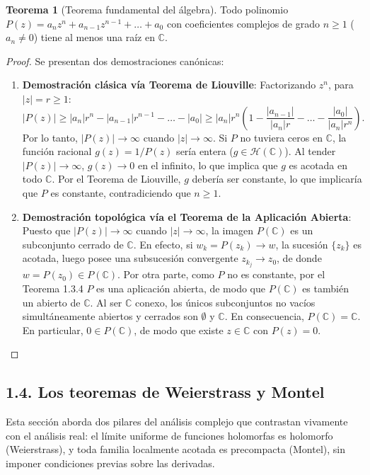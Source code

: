 \documentclass[11pt,a4paper]{article}
\theoremstyle{definition}
\newtheorem{teorema}{Teorema}[section]
\theoremstyle{remark}
\numberwithin{equation}{section}
\begin{document}
\begin{teorema}[Teorema fundamental del álgebra]
Todo polinomio $P(z) = a_n z^n + a_{n-1} z^{n-1} + \dots + a_0$ con coeficientes complejos de grado $n \ge 1$ ($a_n \neq 0$) tiene al menos una raíz en $\mathbb{C}$.
\end{teorema}
\begin{proof}
Se presentan dos demostraciones canónicas:
\begin{enumerate}
\item \textbf{Demostración clásica vía Teorema de Liouville}:
Factorizando $z^n$, para $|z| = r \ge 1$:
\[
|P(z)| \ge |a_n| r^n - |a_{n-1}| r^{n-1} - \dots - |a_0| \ge |a_n| r^n \left( 1 - \frac{|a_{n-1}|}{|a_n|r} - \dots - \frac{|a_0|}{|a_n|r^n} \right).
\]
Por lo tanto, $|P(z)| \to \infty$ cuando $|z| \to \infty$. 
Si $P$ no tuviera ceros en $\mathbb{C}$, la función racional $g(z) = 1/P(z)$ sería entera ($g \in \mathcal{H}(\mathbb{C})$). Al tender $|P(z)| \to \infty$, $g(z) \to 0$ en el infinito, lo que implica que $g$ es acotada en todo $\mathbb{C}$. Por el Teorema de Liouville, $g$ debería ser constante, lo que implicaría que $P$ es constante, contradiciendo que $n \ge 1$.
\item \textbf{Demostración topológica vía el Teorema de la Aplicación Abierta}:
Puesto que $|P(z)| \to \infty$ cuando $|z| \to \infty$, la imagen $P(\mathbb{C})$ es un subconjunto cerrado de $\mathbb{C}$. En efecto, si $w_k = P(z_k) \to w$, la sucesión $\{z_k\}$ es acotada, luego posee una subsucesión convergente $z_{k_j} \to z_0$, de donde $w = P(z_0) \in P(\mathbb{C})$. 
Por otra parte, como $P$ no es constante, por el Teorema 1.3.4 $P$ es una aplicación abierta, de modo que $P(\mathbb{C})$ es también un abierto de $\mathbb{C}$. Al ser $\mathbb{C}$ conexo, los únicos subconjuntos no vacíos simultáneamente abiertos y cerrados son $\emptyset$ y $\mathbb{C}$. En consecuencia, $P(\mathbb{C}) = \mathbb{C}$. En particular, $0 \in P(\mathbb{C})$, de modo que existe $z \in \mathbb{C}$ con $P(z) = 0$.
\end{enumerate}
\end{proof}


\subsection{1.4. Los teoremas de Weierstrass y Montel}

Esta sección aborda dos pilares del análisis complejo que contrastan vivamente con el análisis real: el límite uniforme de funciones holomorfas es holomorfo (Weierstrass), y toda familia localmente acotada es precompacta (Montel), sin imponer condiciones previas sobre las derivadas.
\end{document}
